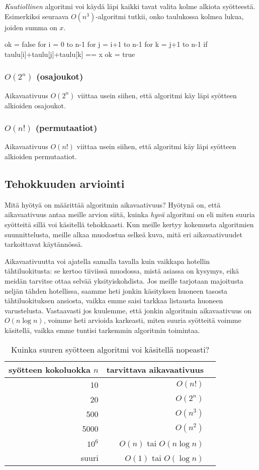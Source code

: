 \emph{Kuutiollinen} algoritmi voi käydä läpi kaikki tavat valita
kolme alkiota syöt\-teestä.
Esimerkiksi seuraava $O(n^3)$-algoritmi tutkii, onko taulukossa
kolmea lukua, joiden summa on $x$.

\begin{code}
ok = false
for i = 0 to n-1
    for j = i+1 to n-1
        for k = j+1 to n-1
            if taulu[i]+taulu[j]+taulu[k] == x
                ok = true
\end{code}

\subsubsection{$O(2^n)$ (osajoukot)}

Aikavaativuus $O(2^n)$ viittaa usein siihen,
että algoritmi käy läpi syötteen alkioiden osajoukot.

\subsubsection{$O(n!)$ (permutaatiot)}

Aikavaativuus $O(n!)$ viittaa usein siihen,
että algoritmi käy läpi syötteen alkioiden permutaatiot.

\subsection{Tehokkuuden arviointi}

Mitä hyötyä on määrittää algoritmin aikavaativuus?
Hyötynä on, että aikavaativuus antaa meille arvion siitä,
kuinka \emph{hyvä} algoritmi on eli miten suuria syötteitä
sillä voi käsitellä tehokkaasti.
Kun meille kertyy kokemusta algoritmien suunnittelusta,
meille alkaa muodostua selkeä kuva,
mitä eri aikavaativuudet tarkoittavat käytännössä.

Aikavaativuutta voi ajatella samalla tavalla kuin vaikkapa
hotellin tähti\-luokitusta: se kertoo tiiviissä muodossa,
mistä asiassa on kysymys, eikä mei\-dän tarvitse ottaa selvää yksityiskohdista.
Jos meille tarjotaan majoitusta neljän tähden hotellissa,
saamme heti jonkin käsityksen huoneen tasosta
tähtiluokituksen ansiosta,
vaikka emme saisi tarkkaa listausta huoneen varustelusta.
Vastaavasti jos kuulemme, että jonkin algoritmin aikavaativuus on $O(n \log n)$,
voimme heti arvioida karkeasti, miten suuria syötteitä voimme käsitellä,
vaikka emme tuntisi tarkemmin algoritmin toimintaa.

\begin{table}
\center
\begin{tabular}{rrr}
syötteen kokoluokka $n$ & tarvittava aikavaativuus \\
\hline
10 & $O(n!)$ \\
20 & $O(2^n)$ \\
500 & $O(n^3)$ \\
5000 & $O(n^2)$ \\
$10^6$ & $O(n)$ tai $O(n \log n)$ \\
suuri & $O(1)$ tai $O(\log n)$ \\
\end{tabular}
\caption{Kuinka suuren syötteen algoritmi voi käsitellä nopeasti?}
\label{tab:algteh}
\end{table}


